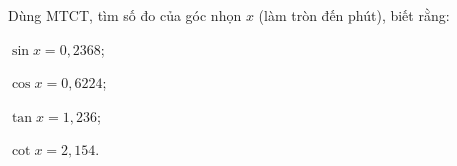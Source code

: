 \begin{exercises}
\begin{questions}[series=SGK]
        \answerline

        \item Dùng MTCT, tìm số đo của góc nhọn $x$ (làm tròn đến phút), biết rằng:
        \begin{questions}
            \item $\sin x=0{,}2368$;
            \item $\cos x=0{,}6224$;
            \item $\tan x=1{,}236$;
            \item $\cot x=2{,}154$.
        \end{questions}

        \answerline
    \end{questions}
\end{exercises}
